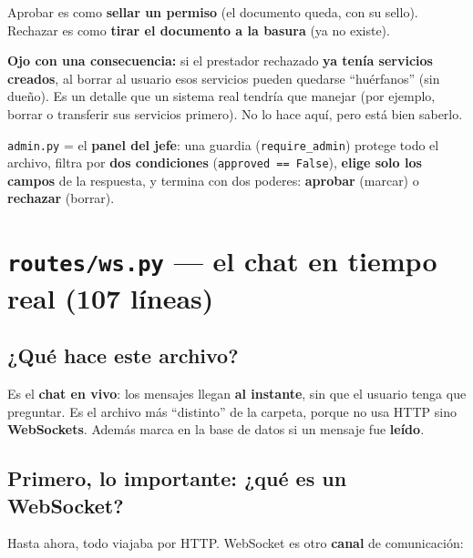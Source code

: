 \documentclass[11pt,a4paper]{article}
\begin{document}
\begin{analogia}
Aprobar es como \textbf{sellar un permiso} (el documento queda, con su sello). Rechazar es
como \textbf{tirar el documento a la basura} (ya no existe).
\end{analogia}

\textbf{Ojo con una consecuencia:} si el prestador rechazado \textbf{ya tenía servicios
creados}, al borrar al usuario esos servicios pueden quedarse ``huérfanos'' (sin dueño). Es un
detalle que un sistema real tendría que manejar (por ejemplo, borrar o transferir sus
servicios primero). No lo hace aquí, pero está bien saberlo.

\begin{recuadro}
\texttt{admin.py} = el \textbf{panel del jefe}: una guardia (\texttt{require\_admin}) protege
todo el archivo, filtra por \textbf{dos condiciones} (\texttt{approved == False}), \textbf{elige
solo los campos} de la respuesta, y termina con dos poderes: \textbf{aprobar} (marcar)
o \textbf{rechazar} (borrar).
\end{recuadro}

\section{\texttt{routes/ws.py} --- el chat en tiempo real (107 líneas)}

\subsection{¿Qué hace este archivo?}

Es el \textbf{chat en vivo}: los mensajes llegan \textbf{al instante}, sin que el usuario
tenga que preguntar. Es el archivo más ``distinto'' de la carpeta, porque no usa HTTP sino
\textbf{WebSockets}. Además marca en la base de datos si un mensaje fue \textbf{leído}.

\subsection{Primero, lo importante: ¿qué es un WebSocket?}

Hasta ahora, todo viajaba por HTTP. WebSocket es otro \textbf{canal} de comunicación:
\end{document}
